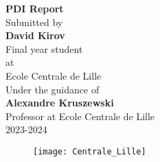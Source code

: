 \begin{titlepage}
\vspace*{\fill}

\begin{center}
\Large \textbf {PDI Report}\\[0.7in]       

\normalsize Submitted by \\[0.2in]
\textbf{David Kirov}\\
Final year student\\
at\\
Ecole Centrale de Lille\\

\vspace{.2in}
Under the guidance of\\[0.2in]
\textbf{Alexandre Kruszewski}\\
Professor at Ecole Centrale de Lille\\[0.5in]
\normalsize 2023-2024\\
\begin{figure}[htbp]
  \centering
  \texttt{[image: Centrale\_Lille]}
  \label{fig:centrale}
\end{figure}

\end{center}
\vspace*{\fill}
\end{titlepage}
